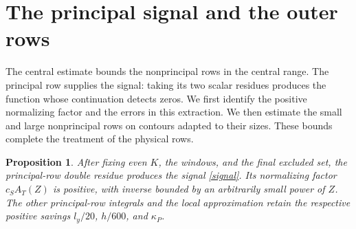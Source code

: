 \documentclass[10pt,reqno,a4paper]{amsart}
\newtheorem{proposition}[theorem]{Proposition}
\theoremstyle{remark}
\begin{document}
\section{The principal signal and the outer rows}\label{sec-signal}

The central estimate bounds the nonprincipal rows in the central range.
The principal row supplies the signal: taking its two scalar residues
produces the function whose continuation detects zeros. We first identify
the positive normalizing factor and the errors in this extraction.
We then estimate the small and large nonprincipal rows on contours
adapted to their sizes. These bounds complete the treatment of the
physical rows.

\begin{proposition}\label{principal-signal}
After fixing even $K$, the windows, and the final excluded set,
the principal-row double residue produces the signal
\eqref{signal}. Its normalizing factor $c_SA_T(Z)$ is positive,
with inverse bounded by an arbitrarily small power of $Z$.
The other principal-row integrals and the local approximation
retain the respective positive savings $l_y/20$, $h/600$, and
$\kappa_P$.
\end{proposition}
\end{document}
